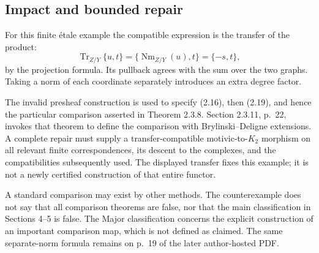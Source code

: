 \documentclass[10pt]{article}
\begin{document}
\subsection*{Impact and bounded repair}
For this finite étale example the compatible expression is the transfer of the product: \[\operatorname{Tr}_{Z/Y}\{u,t\}
    =\{\operatorname{Nm}_{Z/Y}(u),t\}
    =\{-s,t\},\] by the projection formula. Its pullback agrees with the sum over the two graphs. Taking a norm of each coordinate separately introduces an extra degree factor.\par
The invalid presheaf construction is used to specify (2.16), then (2.19), and hence the particular comparison asserted in Theorem 2.3.8. Section 2.3.11, p. 22, invokes that theorem to define the comparison with Brylinski–Deligne extensions. A complete repair must supply a transfer-compatible motivic-to-\(K_2\) morphism on all relevant finite correspondences, its descent to the complexes, and the compatibilities subsequently used. The displayed transfer fixes this example; it is not a newly certified construction of that entire functor.\par
A standard comparison may exist by other methods. The counterexample does not say that all comparison theorems are false, nor that the main classification in Sections 4–5 is false. The Major classification concerns the explicit construction of an important comparison map, which is not defined as claimed. The same separate-norm formula remains on p. 19 of the later author-hosted PDF.\par
\end{document}
